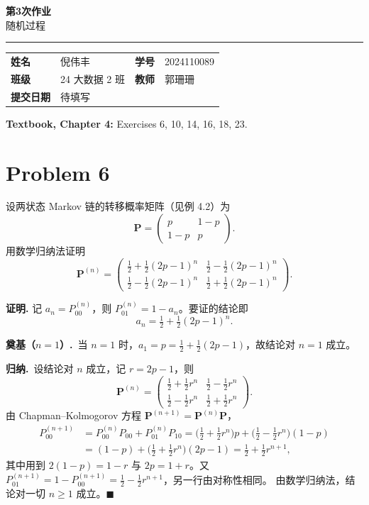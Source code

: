 \documentclass[12pt,a4paper]{article}
\newcommand{\course}{随机过程}
\newcommand{\homeworktitle}{第3次作业}
\newcommand{\studentname}{倪伟丰}
\newcommand{\studentid}{2024110089}
\newcommand{\classname}{24 大数据 2 班}
\newcommand{\teacher}{郭珊珊}
\newcommand{\duedate}{待填写}
\begin{document}
\begin{center}
  {\Huge\bfseries\color{mainblue}\homeworktitle}\\[0.6em]
  {\Large\course}\\[1.2em]
  {\color{linegray}\rule{0.9\textwidth}{0.8pt}}
\end{center}

\begin{infobox}
\begin{tabularx}{\linewidth}{>{\bfseries}p{2.2cm} X >{\bfseries}p{2.2cm} X}
姓名 & \studentname & 学号 & \studentid \\
班级 & \classname & 教师 & \teacher \\
提交日期 & \duedate &  &  \\
\end{tabularx}
\end{infobox}


\noindent\textcolor{textgray}{\textbf{Textbook, Chapter 4:} Exercises 6, 10, 14, 16, 18, 23.}

\section{Problem 6}

设两状态 Markov 链的转移概率矩阵（见例 4.2）为
\[
\mathbf{P}=\begin{pmatrix}
p & 1-p\\
1-p & p
\end{pmatrix}.
\]
用数学归纳法证明
\[
\mathbf{P}^{(n)}=\begin{pmatrix}
\frac12+\frac12(2p-1)^n & \frac12-\frac12(2p-1)^n\\[6pt]
\frac12-\frac12(2p-1)^n & \frac12+\frac12(2p-1)^n
\end{pmatrix}.
\]

\begin{answerbox}
\textbf{证明.}
记 $a_n = P^{(n)}_{00}$，则 $P^{(n)}_{01}=1-a_n$。要证的结论即
\[
a_n=\tfrac12+\tfrac12(2p-1)^n .
\]

\textbf{奠基（$n=1$）.}\ 当 $n=1$ 时，$a_1=p=\frac12+\frac12(2p-1)$，故结论对 $n=1$ 成立。

\textbf{归纳.}\ 设结论对 $n$ 成立，记 $r=2p-1$，则
\[
\mathbf{P}^{(n)}=\begin{pmatrix}\frac12+\frac12r^n & \frac12-\frac12r^n\\[4pt]
\frac12-\frac12r^n & \frac12+\frac12r^n\end{pmatrix}.
\]
由 Chapman--Kolmogorov 方程 $\mathbf{P}^{(n+1)}=\mathbf{P}^{(n)}\mathbf{P}$，
\begin{align*}
P^{(n+1)}_{00}&=P^{(n)}_{00}P_{00}+P^{(n)}_{01}P_{10}
=\Big(\tfrac12+\tfrac12r^n\Big)p+\Big(\tfrac12-\tfrac12r^n\Big)(1-p)\\
&=(1-p)+\Big(\tfrac12+\tfrac12r^n\Big)(2p-1)
=\tfrac12+\tfrac12r^{n+1} ,
\end{align*}
其中用到 $2(1-p)=1-r$ 与 $2p=1+r$。又 $P^{(n+1)}_{01}=1-P^{(n+1)}_{00}=\frac12-\frac12r^{n+1}$，另一行由对称性相同。
由数学归纳法，结论对一切 $n\ge1$ 成立。$\blacksquare$
\end{answerbox}
\end{document}
